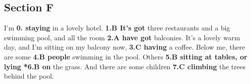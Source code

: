 \documentclass[11pt]{article}
\begin{document}
\subsection{Section F}
\label{sec:org7bdff8b}
I'm \textbf{0. staying} in a lovely hotel.
\textbf{1.B It's got} three restaurants and a big swimming pool, and all the room
\textbf{2.A have got} balconies. It's a lovely warm day, and I'm sitting on my balcony now,
\textbf{3.C having} a coffee. Below me, there are some
\textbf{4.B people} swimming in the pool. Others
\textbf{5.B sitting at tables, or lying
*6.B on} the grass. And there are some children
\textbf{7.C climbing} the trees behind the pool.
\end{document}
